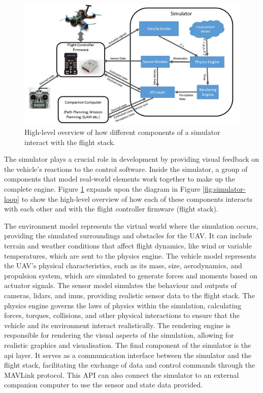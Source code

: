 
\begin{figure}
  \centering
  \includegraphics[width=\textwidth,keepaspectratio]{img/airsim-overview.png}
  \caption{High-level overview of how different components of a simulator interact with the flight stack.}
  \label{fig:airsim-overview}
\end{figure}

The simulator plays a crucial role in development by providing visual feedback on the vehicle’s reactions to the control software.
Inside the simulator, a group of components that model real-world elements work together to make up the complete engine.
Figure \ref{fig:airsim-overview} expands upon the diagram in Figure \ref{fig:simulator-loop} to show the high-level overview of how each of these components interacts with each other and with the flight controller firmware (flight stack).

The environment model represents the virtual world where the simulation occurs, providing the simulated surroundings and obstacles for the UAV. It can include terrain and weather conditions that affect flight dynamics, like wind or variable temperatures, which are sent to the physics engine. 
The vehicle model represents the UAV's physical characteristics, such as its mass, size, aerodynamics, and propulsion system, which are simulated to generate forces and moments based on actuator signals.
The sensor model simulates the behaviour and outputs of cameras, lidars, and \acrshort{imu}s, providing realistic sensor data to the flight stack.
The physics engine governs the laws of physics within the simulation, calculating forces, torques, collisions, and other physical interactions to ensure that the vehicle and its environment interact realistically.
The rendering engine is responsible for rendering the visual aspects of the simulation, allowing for realistic graphics and visualisation.
The final component of the simulator is the \acrshort{api} layer. It serves as a communication interface between the simulator and the flight stack, facilitating the exchange of data and control commands through the MAVLink protocol. This API can also connect the simulator to an external companion computer to use the sensor and state data provided. 

